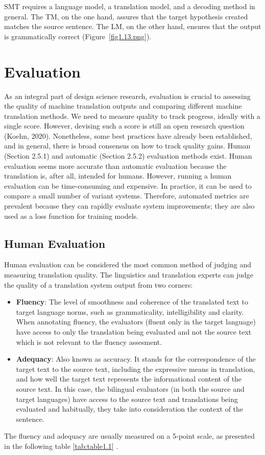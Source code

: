 SMT requires a language model, a translation model, and a decoding method in general. The TM, on the one hand, assures that the target hypothesis created matches the source sentence. The LM, on the other hand, ensures that the output is grammatically correct  (Figure~\ref{fig1.13.png}).

\section{Evaluation}
As an integral part of design science research, evaluation is crucial to assessing the quality of machine translation outputs and comparing different machine translation methods. We need to measure quality to track progress, ideally with a single score.
However, devising such a score is still an open research question (Koehn, 2020).
Nonetheless, some best practices have already been established, and in general,
there is broad consensus on how to track quality gains.
Human (Section 2.5.1) and automatic (Section 2.5.2) evaluation methods exist.
Human evaluation seems more accurate than automatic evaluation because the
translation is, after all, intended for humans. However, running a human evaluation can be time-consuming and expensive.
In practice, it can be used to compare a small number of variant systems. Therefore, automated metrics are prevalent because they can rapidly evaluate system improvements; they are also used as a loss function for training models.

\subsection{Human Evaluation}
Human evaluation can be considered the most common method of judging and measuring translation quality. The linguistics and translation experts can judge the quality of a translation system output from two corners: 
\begin{itemize}
	\item \textbf{Fluency}: The level of smoothness and coherence of the translated text to target language norms,  such as grammaticality, intelligibility and clarity.  When annotating fluency, the evaluators (fluent only in the target language) have access to only the translation being evaluated and not the source text which is not relevant to the fluency assesment. 
	\item \textbf{Adequacy}: Also known as accuracy. It stands for the correspondence of the target text to the source text, including the expressive means in translation, and how well the target text represents the informational content of the source text. In this case, the bilingual evaluators (in both the source and target languages) have access to the source text and translations being evaluated and habitually, they take into consideration the context of the sentence.   
\end{itemize}
The fluency and adequacy are usually measured on a 5-point scale, as presented in the following table \ref{tab:table1.1} \cite{mauvcec19}.

